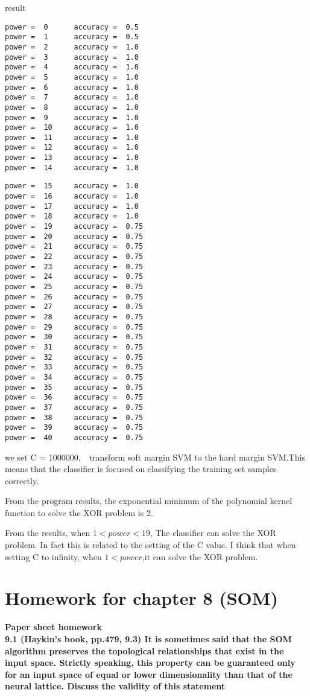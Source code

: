\noindent result
\begin{lstlisting}
power =  0      accuracy =  0.5
power =  1      accuracy =  0.5
power =  2      accuracy =  1.0
power =  3      accuracy =  1.0
power =  4      accuracy =  1.0
power =  5      accuracy =  1.0
power =  6      accuracy =  1.0
power =  7      accuracy =  1.0
power =  8      accuracy =  1.0
power =  9      accuracy =  1.0
power =  10     accuracy =  1.0
power =  11     accuracy =  1.0
power =  12     accuracy =  1.0
power =  13     accuracy =  1.0
power =  14     accuracy =  1.0
\end{lstlisting}
\newpage
\begin{lstlisting}
power =  15     accuracy =  1.0
power =  16     accuracy =  1.0
power =  17     accuracy =  1.0
power =  18     accuracy =  1.0
power =  19     accuracy =  0.75
power =  20     accuracy =  0.75
power =  21     accuracy =  0.75
power =  22     accuracy =  0.75
power =  23     accuracy =  0.75
power =  24     accuracy =  0.75
power =  25     accuracy =  0.75
power =  26     accuracy =  0.75
power =  27     accuracy =  0.75
power =  28     accuracy =  0.75
power =  29     accuracy =  0.75
power =  30     accuracy =  0.75
power =  31     accuracy =  0.75
power =  32     accuracy =  0.75
power =  33     accuracy =  0.75
power =  34     accuracy =  0.75
power =  35     accuracy =  0.75
power =  36     accuracy =  0.75
power =  37     accuracy =  0.75
power =  38     accuracy =  0.75
power =  39     accuracy =  0.75
power =  40     accuracy =  0.75
\end{lstlisting}
we set C = 1000000,~~transform soft margin SVM to the hard margin SVM.This means that the classifier is focused on classifying the training set samples correctly.

\noindent From the program results, the exponential minimum of the polynomial kernel function to solve the XOR problem is 2.

\noindent From the results, when $1<power<19$, The classifier can solve the XOR problem. In fact this is related to the setting of the C value. I think that when setting C to infinity, when $1<power$,it can solve the XOR problem.


\newpage
\section{Homework for chapter 8 (SOM)}
\noindent\textbf{Paper sheet homework\\
9.1 (Haykin’s book, pp.479, 9.3) It is sometimes said that the SOM algorithm preserves the topological
relationships that exist in the input space. Strictly speaking, this property can be guaranteed only for an
input space of equal or lower dimensionality than that of the neural lattice. Discuss the validity of this
statement}

